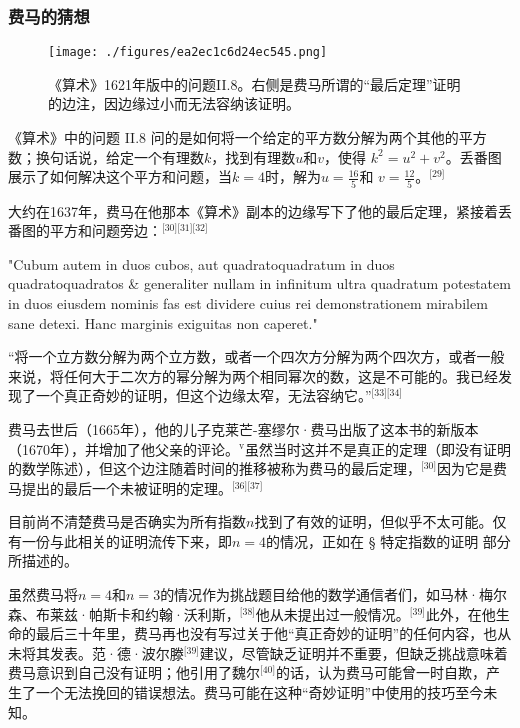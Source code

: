 \subsubsection{费马的猜想}
\begin{figure}[ht]
\centering
\texttt{[image: ./figures/ea2ec1c6d24ec545.png]}
\caption{《算术》1621年版中的问题II.8。右侧是费马所谓的“最后定理”证明的边注，因边缘过小而无法容纳该证明。} \label{fig_FMDL_1}
\end{figure}
《算术》中的问题 II.8 问的是如何将一个给定的平方数分解为两个其他的平方数；换句话说，给定一个有理数\( k \)，找到有理数\( u \)和\( v \)，使得 \( k^2 = u^2 + v^2 \)。丢番图展示了如何解决这个平方和问题，当\( k = 4 \)时，解为\( u = \frac{16}{5} \)和 \( v = \frac{12}{5} \)。\(^\text{[29]}\)

大约在1637年，费马在他那本《算术》副本的边缘写下了他的最后定理，紧接着丢番图的平方和问题旁边：\(^\text{[30][31][32]}\)

"Cubum autem in duos cubos, aut quadratoquadratum in duos quadratoquadratos & generaliter nullam in infinitum ultra quadratum potestatem in duos eiusdem nominis fas est dividere cuius rei demonstrationem mirabilem sane detexi. Hanc marginis exiguitas non caperet."

“将一个立方数分解为两个立方数，或者一个四次方分解为两个四次方，或者一般来说，将任何大于二次方的幂分解为两个相同幂次的数，这是不可能的。我已经发现了一个真正奇妙的证明，但这个边缘太窄，无法容纳它。”\(^\text{[33][34]}\)

费马去世后（1665年），他的儿子克莱芒-塞缪尔·费马出版了这本书的新版本（1670年），并增加了他父亲的评论。\(^\text{v}\)虽然当时这并不是真正的定理（即没有证明的数学陈述），但这个边注随着时间的推移被称为费马的最后定理，\(^\text{[30]}\)因为它是费马提出的最后一个未被证明的定理。\(^\text{[36][37]}\)

目前尚不清楚费马是否确实为所有指数\( n \)找到了有效的证明，但似乎不太可能。仅有一份与此相关的证明流传下来，即\( n = 4 \)的情况，正如在 § 特定指数的证明 部分所描述的。

虽然费马将\( n = 4 \)和\( n = 3 \)的情况作为挑战题目给他的数学通信者们，如马林·梅尔森、布莱兹·帕斯卡和约翰·沃利斯，\(^\text{[38]}\)他从未提出过一般情况。\(^\text{[39]}\)此外，在他生命的最后三十年里，费马再也没有写过关于他“真正奇妙的证明”的任何内容，也从未将其发表。范·德·波尔滕\(^\text{[39]}\)建议，尽管缺乏证明并不重要，但缺乏挑战意味着费马意识到自己没有证明；他引用了魏尔\(^\text{[40]}\)的话，认为费马可能曾一时自欺，产生了一个无法挽回的错误想法。费马可能在这种“奇妙证明”中使用的技巧至今未知。

